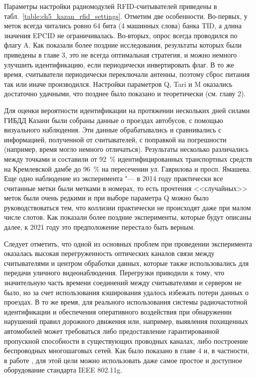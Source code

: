 Параметры настройки радиомодулей RFID-считывателей приведены в табл.~\ref{table:ch5_kazan_rfid_settings}. Отметим две особенности. Во-первых, у меток всегда читались ровно 64 бита (4 машинных слова) банка TID, а длина значения EPCID не ограничивалась. Во-вторых, опрос всегда проводился по флагу A. Как показали более поздние исследования, результаты которых были приведены в главе 3, это не всегда оптимальная стратегия, и можно немного улучшить идентификацию, если периодически инвертировать флаг. В то же время, считыватели периодически переключали антенны, поэтому сброс питания так или иначе производился. Настройки параметров Q, Tari и M оказались достаточно удачными, что позднее было показано и теоретически (см. главу 2).

Для оценки вероятности идентификации на протяжении нескольких дней силами ГИБДД Казани были собраны данные о проездах автобусов, с помощью визуального наблюдения. Эти данные обрабатывались и сравнивались с информацией, полученной от считывателей, с поправкой на погрешности (например, время могло немного отличаться). Результаты несколько различались между точками и составили от 92~\% идентифицированных транспортных средств на Кремлевской дамбе до 96~\% на пересечении ул. Гаврилова и просп. Ямашева. Еще одно наблюдение из эксперимента "--- в 2014 году практически все считанные метки были метками в номерах, то есть прочтения <<случайных>> меток были очень редкими и при выборе параметра Q можно было руководствоваться тем, что коллизии практически не происходят даже при малом числе слотов. Как показали более поздние эксперименты, которые будут описаны далее, к 2021 году это предположение перестало быть верным.

Следует отметить, что одной из основных проблем при проведении эксперимента оказалась высокая перегруженность оптических каналов связи между считывателями и центром обработки данных, которые также использовались для передачи уличного видеонаблюдения. Перегрузки приводили к тому, что значительную часть времени соединений между считывателями и сервером не было, но за счет использования кэширования удалось избежать потери данных о проездах. В то же время, для реального использования системы радиочастотной идентификации и обеспечения оперативного воздействия при обнаружении нарушений правил дорожного движения или, например, выявления похищенных автомобилей может требоваться либо предоставление гарантированной пропускной способности в существующих проводных каналах, либо построение беспроводных многошаговых сетей. Как было показано в главе 4 и, в частности, в работе \cite{WINET_DCCN2018}, для этой цели можно использовать даже самое простое и доступное оборудование стандарта IEEE 802.11g.



